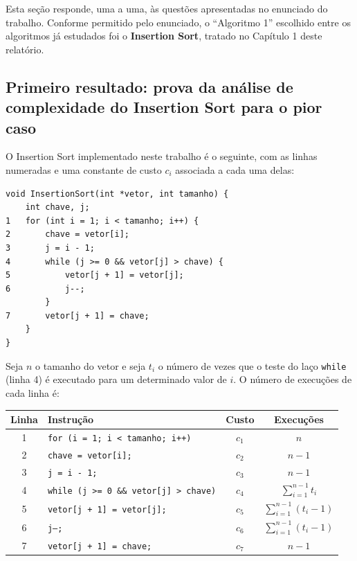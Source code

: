 \label{sec:resultados}

\qquad Esta seção responde, uma a uma, às questões apresentadas no
enunciado do trabalho. Conforme permitido pelo enunciado, o
``Algoritmo 1'' escolhido entre os algoritmos já estudados foi o
\textbf{Insertion Sort}, tratado no Capítulo 1 deste relatório.

\subsection{Primeiro resultado: prova da análise de complexidade do Insertion Sort para o pior caso}

\qquad O Insertion Sort implementado neste trabalho é o seguinte, com
as linhas numeradas e uma constante de custo $c_i$ associada a cada
uma delas:

\begin{verbatim}
void InsertionSort(int *vetor, int tamanho) {
    int chave, j;
1   for (int i = 1; i < tamanho; i++) {
2       chave = vetor[i];
3       j = i - 1;
4       while (j >= 0 && vetor[j] > chave) {
5           vetor[j + 1] = vetor[j];
6           j--;
        }
7       vetor[j + 1] = chave;
    }
}
\end{verbatim}

\qquad Seja $n$ o tamanho do vetor e seja $t_i$ o número de vezes que o
teste do laço \texttt{while} (linha 4) é executado para um
determinado valor de $i$. O número de execuções de cada linha é:

\begin{center}
\begin{tabular}{|c|l|c|c|}
    \hline
    Linha & Instrução & Custo & Execuções \\
    \hline
    1 & \texttt{for (i = 1; i < tamanho; i++)} & $c_1$ & $n$ \\
    \hline
    2 & \texttt{chave = vetor[i];} & $c_2$ & $n-1$ \\
    \hline
    3 & \texttt{j = i - 1;} & $c_3$ & $n-1$ \\
    \hline
    4 & \texttt{while (j >= 0 \&\& vetor[j] > chave)} & $c_4$ & $\sum_{i=1}^{n-1} t_i$ \\
    \hline
    5 & \texttt{vetor[j + 1] = vetor[j];} & $c_5$ & $\sum_{i=1}^{n-1} (t_i - 1)$ \\
    \hline
    6 & \texttt{j--;} & $c_6$ & $\sum_{i=1}^{n-1} (t_i - 1)$ \\
    \hline
    7 & \texttt{vetor[j + 1] = chave;} & $c_7$ & $n-1$ \\
    \hline
\end{tabular}
\end{center}

